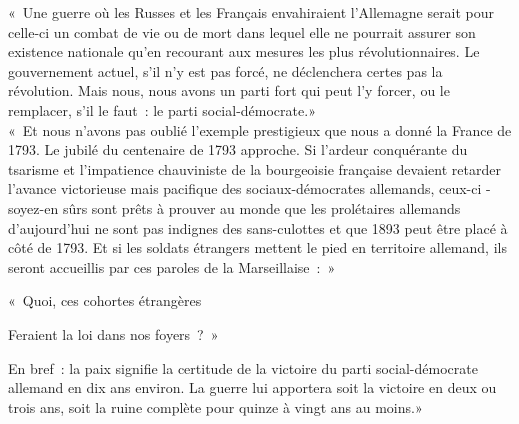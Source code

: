 \documentclass[french,twoside]{book} %
\newenvironment{quoteblock}%
  {\begin{quoting}}
  {\end{quoting}}
\newenvironment{quotebar}{%
    \def\FrameCommand{{\color{rubric!10!}\vrule width 0.5em} \hspace{0.9em}}%
    \def\OuterFrameSep{\itemsep} %
    \MakeFramed {\advance\hsize-\width \FrameRestore}
  }%
  {%
    \endMakeFramed
  }
\renewenvironment{quoteblock}%
  {%
    \savenotes
    \setstretch{0.9}
    \normalfont
    \begin{quotebar}
  }
  {%
    \end{quotebar}
    \spewnotes
  }
\begin{document}
\begin{quoteblock}
 \noindent « Une guerre où les Russes et les Français envahiraient l’Allemagne serait pour celle-ci un combat de vie ou de mort dans lequel elle ne pourrait assurer son existence nationale qu’en recourant aux mesures les plus révolutionnaires. Le gouvernement actuel, s’il n’y est pas forcé, ne déclenchera certes pas la révolution. Mais nous, nous avons un parti fort qui peut l’y forcer, ou le remplacer, s’il le faut : le parti social-démocrate.» \\
« Et nous n’avons pas oublié l’exemple prestigieux que nous a donné la France de 1793. Le jubilé du centenaire de 1793 approche. Si l’ardeur conquérante du tsarisme et l’impatience chauviniste de la bourgeoisie française devaient retarder l’avance victorieuse mais pacifique des sociaux-démocrates allemands, ceux-ci - soyez-en sûrs sont prêts à prouver au monde que les prolétaires allemands d’aujourd’hui ne sont pas indignes des sans-culottes et que 1893 peut  être placé à côté de 1793. Et si les soldats étrangers mettent le pied en territoire allemand, ils seront accueillis par ces paroles de la Marseillaise : »\par
 « Quoi, ces cohortes étrangères\par
 Feraient la loi dans nos foyers ? »\par
 En bref : la paix signifie la certitude de la victoire du parti social-démocrate allemand en dix ans environ. La guerre lui apportera soit la victoire en deux ou trois ans, soit la ruine complète pour quinze à vingt ans au moins.»
\end{quoteblock}
\end{document}
